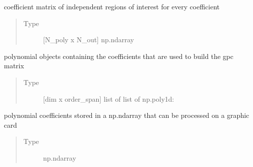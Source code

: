 \documentclass[letterpaper,10pt,english,openany,oneside]{sphinxmanual}
\begin{document}
\begin{fulllineitems}
\begin{fulllineitems}
\end{fulllineitems}


\begin{fulllineitems}
\label{\detokenize{pygpc:pygpc.gpc.gPC.gpc_coeffs}}
coefficient matrix of independent regions of interest for every coefficient
\begin{quote}\begin{description}
\item[{Type}] \leavevmode
{[}N\_poly x N\_out{]} np.ndarray

\end{description}\end{quote}

\end{fulllineitems}


\begin{fulllineitems}
\label{\detokenize{pygpc:pygpc.gpc.gPC.poly}}
polynomial objects containing the coefficients that are used to build the gpc matrix
\begin{quote}\begin{description}
\item[{Type}] \leavevmode
{[}dim x order\_span{]} list of list of np.poly1d:

\end{description}\end{quote}

\end{fulllineitems}


\begin{fulllineitems}
\label{\detokenize{pygpc:pygpc.gpc.gPC.poly_gpu}}
polynomial coefficients stored in a np.ndarray that can be processed on a graphic card
\begin{quote}\begin{description}
\item[{Type}] \leavevmode
np.ndarray

\end{description}\end{quote}

\end{fulllineitems}


\end{fulllineitems}
\end{document}
